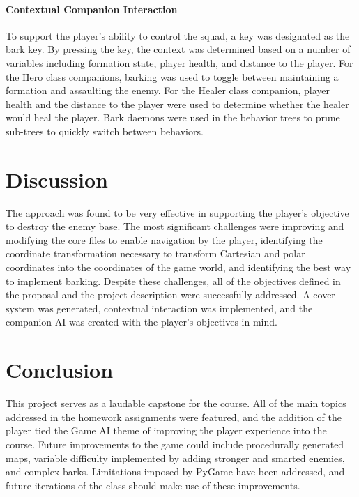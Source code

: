 \documentclass[11pt]{article}
\begin{document}
\paragraph{Contextual Companion Interaction}
To support the player's ability to control the squad, a key was designated as the bark key. By pressing the key, the context was determined based on a number of variables including formation state, player health, and distance to the player. For the Hero class companions, barking was used to toggle between maintaining a formation and assaulting the enemy. For the Healer class companion, player health and the distance to the player were used to determine whether the healer would heal the player. Bark daemons were used in the behavior trees to prune sub-trees to quickly switch between behaviors. 

\section{Discussion}
The approach was found to be very effective in supporting the player's objective to destroy the enemy base. The most significant challenges were improving and modifying the core files to enable navigation by the player, identifying the coordinate transformation necessary to transform Cartesian and polar coordinates into the coordinates of the game world, and identifying the best way to implement barking. Despite these challenges, all of the objectives defined in the proposal and the project description were successfully addressed. A cover system was generated, contextual interaction was implemented, and the companion AI was created with the player's objectives in mind.

\section{Conclusion}
This project serves as a laudable capstone for the course. All of the main topics addressed in the homework assignments were featured, and the addition of the player tied the Game AI theme of improving the player experience into the course. Future improvements to the game could include procedurally generated maps, variable difficulty implemented by adding stronger and smarted enemies, and complex barks. Limitations imposed by PyGame have been addressed, and future iterations of the class should make use of these improvements.
\end{document}

